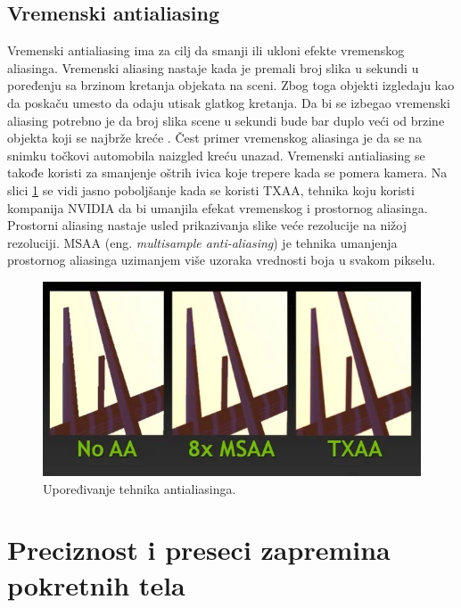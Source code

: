\documentclass[12pt,oneside]{memoir}
\begin{document}
\subsection{Vremenski antialiasing}

Vremenski antialiasing ima za cilj da smanji ili ukloni efekte vremenskog aliasinga.
Vremenski aliasing nastaje kada je premali broj slika u sekundi u poređenju sa brzinom kretanja objekata na sceni.
Zbog toga objekti izgledaju kao da poskaču  umesto da odaju utisak glatkog kretanja.
Da bi se izbegao vremenski aliasing potrebno je da broj slika scene u sekundi bude bar duplo veći 
od brzine objekta koji se najbrže kreće \cite{Grant}. 
Čest primer vremenskog aliasinga je da se na snimku točkovi automobila naizgled kreću unazad.
Vremenski antialiasing se takođe koristi za smanjenje oštrih ivica koje trepere kada se pomera kamera.
Na slici \ref{fig:txaa} se vidi jasno poboljšanje kada se koristi TXAA,
tehnika koju koristi kompanija NVIDIA da bi umanjila efekat vremenskog i prostornog aliasinga.
Prostorni aliasing nastaje usled prikazivanja slike veće rezolucije na nižoj rezoluciji.
MSAA (eng. {\em multisample anti-aliasing}) je tehnika umanjenja prostornog aliasinga 
uzimanjem više uzoraka vrednosti boja u svakom pikselu.

\begin{figure}[h!]
	\begin{center}
	\includegraphics[scale=0.65]{txaa.png}
	\end{center}
	\caption{Upoređivanje tehnika antialiasinga.}
	\label{fig:txaa}
\end{figure}

\section{Preciznost i preseci zapremina pokretnih tela}
\end{document}
